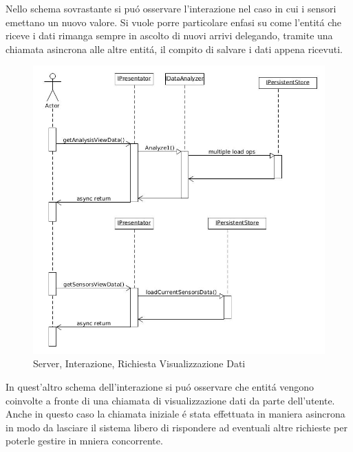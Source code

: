 Nello schema sovrastante si pu\'o osservare l'interazione nel caso in cui i sensori emettano un nuovo valore. Si vuole porre particolare enfasi su come l'entit\'a che riceve i dati rimanga sempre in ascolto di nuovi arrivi delegando, tramite una chiamata asincrona alle altre entit\'a, il compito di salvare i dati appena ricevuti.

\newpage

\begin{figure}[h]
\centering
\includegraphics[scale=0.4]{Figures/DomainModel/Server/GetOperationInteraction}
\caption{Server, Interazione, Richiesta Visualizzazione Dati}
\end{figure}

In quest'altro schema dell'interazione si pu\'o osservare che entit\'a vengono coinvolte a fronte di una chiamata di visualizzazione dati da parte dell'utente. Anche in questo caso la chiamata iniziale \'e stata effettuata in maniera asincrona in modo da lasciare il sistema libero di rispondere ad eventuali altre richieste per poterle gestire in mniera concorrente.

\newpage

